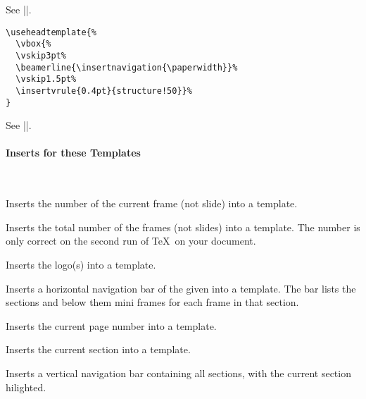 \begin{command}{\useheadtemplate{}}
  See |\usefoottemplate|.
  \example
\begin{verbatim}
\useheadtemplate{%
  \vbox{%
  \vskip3pt%
  \beamerline{\insertnavigation{\paperwidth}}%
  \vskip1.5pt%
  \insertvrule{0.4pt}{structure!50}}%
}
\end{verbatim}
\end{command}

\begin{command}{\addtoheadtemplate{}}
  See |\addtofoottemplate|.
\end{command}


\paragraph{Inserts for these Templates}\ 

\begin{command}{\insertframenumber}
  Inserts the number of the current frame (not slide) into a template.
\end{command}

\begin{command}{\inserttotalframenumber}
  Inserts the total number of the frames (not slides) into a
  template. The number is only correct on the second run of \TeX\ on
  your document.
\end{command}

\begin{command}{\insertlogo}
  Inserts the logo(s) into a template.
\end{command}

\begin{command}{\insertnavigation{}}
  Inserts a horizontal navigation bar of the given  into a
  template. The bar lists the sections and below them mini frames for
  each frame in that section.
\end{command}

\begin{command}{\insertpagenumber}
  Inserts the current page number into a template.
\end{command}

\begin{command}{\insertsection}
  Inserts the current section into a template.
\end{command}

\begin{command}{\insertsectionnavigation{}}
  Inserts a vertical navigation bar containing all sections, with the
  current section hilighted.
\end{command}

